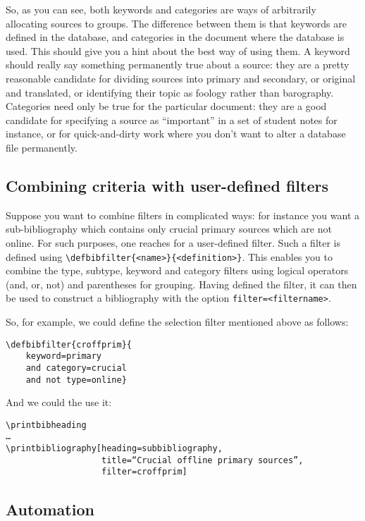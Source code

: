 So, as you can see, both keywords and categories are ways of arbitrarily
allocating sources to groups. The difference between them is that
keywords are defined in the database, and categories in the document
where the database is used. This should give you a hint about the best
way of using them. A keyword should really say something permanently
true about a source: they are a pretty reasonable candidate for dividing
sources into primary and secondary, or original and translated, or
identifying their topic as foology rather than barography. Categories
need only be true for the particular document: they are a good candidate
for specifying a source as ``important'' in a set of student notes for
instance, or for quick-and-dirty work where you don't want to alter a
database file permanently.

\subsection{Combining criteria with user-defined filters}

Suppose you want to combine filters in complicated ways: for instance
you want a sub-bibliography which contains only crucial primary sources
which are not online. For such purposes, one reaches for a user-defined
filter. Such a filter is defined using
\texttt{\textbackslash{}defbibfilter\{\textless{}name\textgreater{}\}\{\textless{}definition\textgreater{}\}}.
This enables you to combine the type, subtype, keyword and category
filters using logical operators (and, or, not) and parentheses for
grouping. Having defined the filter, it can then be used to construct a
bibliography with the option
\texttt{filter=\textless{}filtername\textgreater{}}.

So, for example, we could define the selection filter mentioned above as
follows:

\begin{verbatim}
\defbibfilter{croffprim}{
    keyword=primary
    and category=crucial
    and not type=online}
\end{verbatim}
And we could the use it:

\begin{verbatim}
\printbibheading
…
\printbibliography[heading=subbibliography,
                   title=“Crucial offline primary sources”,
                   filter=croffprim]
\end{verbatim}

\subsection{Automation}

